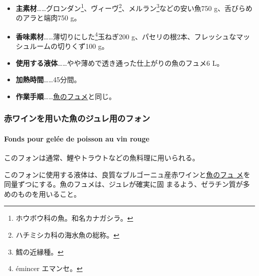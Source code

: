 \begin{recette}
\begin{itemize}
\item
  \textbf{主素材}\ldots{}\ldots{}グロンダン\footnote{ホウボウ科の魚。和名カナガシラ。}、ヴィーヴ\footnote{ハチミシカ科の海水魚の総称。}、メルラン\footnote{鱈の近縁種。}などの安い魚750
  g、舌びらめのアラと端肉750 g。
\item
  \textbf{香味素材}\ldots{}\ldots{}薄切りにした\footnote{émincer
    エマンセ。}玉ねぎ200
  g、パセリの根2本、フレッシュなマッシュルームの切りくず100 g。
\item
  \textbf{使用する液体}\ldots{}\ldots{}やや薄めで透き通った仕上がりの魚のフュメ6
  L。
\item
  \textbf{加熱時間}\ldots{}\ldots{}45分間。
\item
  \textbf{作業手順}\ldots{}\ldots{}\protect\hyperlink{fumet-de-poisson}{魚のフュメ}と同じ。
\end{itemize}

\maeaki

\hypertarget{ux8d64ux30efux30a4ux30f3ux3092ux7528ux3044ux305fux9b5aux306eux30b8ux30e5ux30ecux7528ux306eux30d5ux30a9ux30f3}{%
\subsubsection{赤ワインを用いた魚のジュレ用のフォン}\label{ux8d64ux30efux30a4ux30f3ux3092ux7528ux3044ux305fux9b5aux306eux30b8ux30e5ux30ecux7528ux306eux30d5ux30a9ux30f3}}

\hypertarget{fonds-pour-gelee-de-poisson-au-vin-rouge}{%
\paragraph{Fonds pour gelée de poisson au vin
rouge}\label{fonds-pour-gelee-de-poisson-au-vin-rouge}}


このフォンは通常、鯉やトラウトなどの魚料理に用いられる。

このフォンに使用する液体は、良質なブルゴーニュ産赤ワインと\protect\hyperlink{fumet-de-poisson}{魚のフュ
メ}を同量ずつにする。魚のフュメは、ジュレが確実に固
まるよう、ゼラチン質が多めのものを用いること。


\end{recette}
